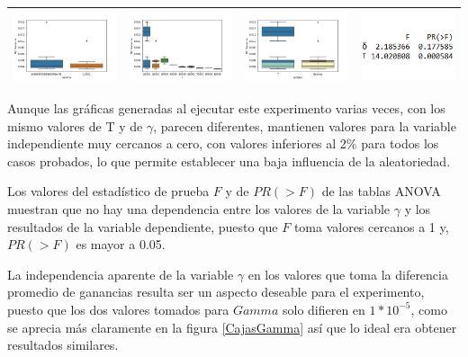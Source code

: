 \begin{table}[]
\begin{tabular}[c]{llll}
\multicolumn{1}{|l|}{\includegraphics[align=t, width=33mm]{cajasGamma_exp43.jpg}}    & \multicolumn{1}{l|}{\includegraphics[align=t, width=33mm]{cajasT_exp43.jpg} } & \multicolumn{1}{l|}{\includegraphics[align=t, width=33mm]{cajasT_Gamma_exp43.jpg} } & \multicolumn{1}{p{3.2cm}|}{\includegraphics[align=t, width=30mm]{Anova43.png}} \\ \hline
\end{tabular}
\label{exp4}
\end{table}

Aunque las gráficas generadas al ejecutar este experimento varias veces, con los mismo valores de T y de $\gamma$, parecen diferentes, mantienen valores para la variable independiente muy cercanos a cero, con valores inferiores al 2\% para todos los casos probados, lo que permite establecer una baja influencia de la aleatoriedad.

Los  valores del estadístico de prueba $F$ y de $PR(>F)$ de las tablas ANOVA muestran que no hay una dependencia entre los valores de la variable $\gamma$ y los resultados de la variable dependiente, puesto que $F$ toma valores cercanos a 1 y, $PR(>F)$ es mayor a 0.05. 

La independencia aparente de la variable $\gamma$ en los valores que toma la diferencia promedio de ganancias resulta ser un aspecto deseable para el experimento, puesto que los dos valores tomados para $Gamma$ solo difieren en $1*10^{-5}$, como se aprecia más claramente en la figura \ref{CajasGamma} así que lo ideal era obtener resultados similares. 

